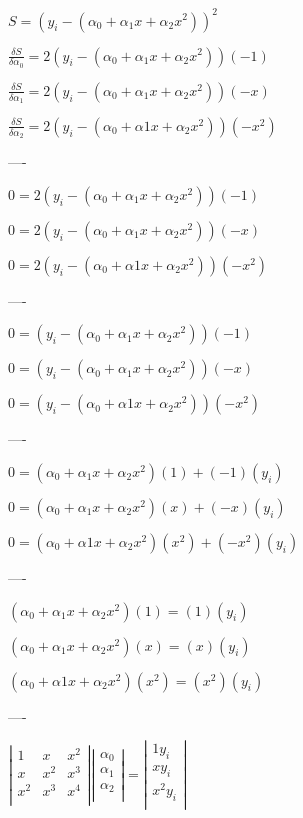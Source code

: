 \documentclass[brazilian,12pt,a4paper,final]{article}
\begin{document}

$S = (y_i-({\alpha}_0 +{\alpha}_1 x+ {\alpha}_2 x^2))^2$

$\frac{\delta S}{\delta {\alpha}_0} = 2(y_i-({\alpha}_0 +{\alpha}_1 x+ {\alpha}_2 x^2))(-1)$

$\frac{\delta S}{\delta {\alpha}_1} = 2(y_i-({\alpha}_0 +{\alpha}_1 x+ {\alpha}_2 x^2))(-x)$

$\frac{\delta S}{\delta {\alpha}_2} = 2(y_i-({\alpha}_0 +{\alpha} 1 x+ {\alpha}_2 x^2))(-x^2)$

----

$0 = 2(y_i-({\alpha}_0 +{\alpha}_1 x+ {\alpha}_2 x^2))(-1)$

$0 = 2(y_i-({\alpha}_0 +{\alpha}_1 x+ {\alpha}_2 x^2))(-x)$

$0 = 2(y_i-({\alpha}_0 +{\alpha} 1 x+ {\alpha}_2 x^2))(-x^2)$

----

$0 = (y_i-({\alpha}_0 +{\alpha}_1 x+ {\alpha}_2 x^2))(-1)$

$0 = (y_i-({\alpha}_0 +{\alpha}_1 x+ {\alpha}_2 x^2))(-x)$

$0 = (y_i-({\alpha}_0 +{\alpha} 1 x+ {\alpha}_2 x^2))(-x^2)$

----

$0 = ({\alpha}_0 +{\alpha}_1 x+ {\alpha}_2 x^2)(1)+(-1)(y_i)$

$0 = ({\alpha}_0 +{\alpha}_1 x+ {\alpha}_2 x^2)(x)+(-x)(y_i)$

$0 = ({\alpha}_0 +{\alpha} 1 x+ {\alpha}_2 x^2)(x^2)+(-x^2)(y_i)$

----

$({\alpha}_0 +{\alpha}_1 x+ {\alpha}_2 x^2)(1)=(1)(y_i)$

$({\alpha}_0 +{\alpha}_1 x+ {\alpha}_2 x^2)(x)=(x)(y_i)$

$({\alpha}_0 +{\alpha} 1 x+ {\alpha}_2 x^2)(x^2)=(x^2)(y_i)$

----

$
\left|\begin{array}{ccc}
1   & x   & x^2\\
x   & x^2 & x^3\\
x^2 & x^3 & x^4\\
\end{array} \right|
\left|\begin{array}{c}
{\alpha}_0\\
{\alpha}_1\\
{\alpha}_2\\
\end{array} \right|
= 
\left|\begin{array}{c}
1 y_i\\
x y_i\\
x^2 y_i\\
\end{array} \right|
$
\end{document}
